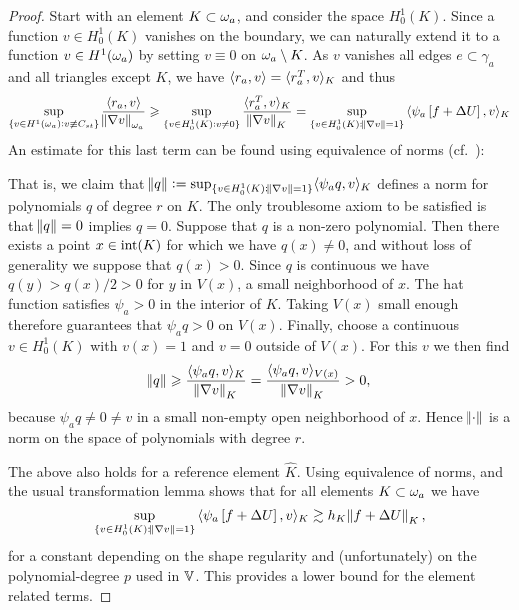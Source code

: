 \documentclass[thesis.tex]{subfiles}
\begin{document}
\begin{proof}
  Start with an element $K \subset \omega_a$, and consider the space $H_0^1(K)$. Since a function $v \in H_0^1(K)$ vanishes on the boundary, 
  we can naturally extend it to a function $v \in H^1(\omega_a)$ by setting $v \equiv 0$ on $\omega_a \setminus K$. As $v$
  vanishes all edges $e \subset \gamma_a$ and all triangles except $K$, we have $\langle r_a, v \rangle = \langle{r_a^T, v}\rangle_K$ and thus
  \[
    \sup_{\{v \in H^1(\omega_a) : v \not \equiv C_{st}\}} { \langle r_a, v \rangle \over \norm{\nabla v}_{\omega_a}} 
    \geqslant \sup_{\{v \in H_0^1(K) : v \ne 0\}} { \langle{r^T_a, v}\rangle_K \over \norm{\nabla v}_{K}}
    = \sup_{\{v \in H_0^1(K) :  \norm{\nabla v}=1\}} { \langle\psi_a\left[ f + \Delta U\right],v\rangle_K }
  \]
  An estimate for this last term can be found using equivalence of norms (cf.~\cite[Ex~9.x.5]{brenner}):
  
  That is, we claim that $\norm{q} := \sup_{\{v \in H_0^1(K) : \norm{\nabla v}=1\}} \langle \psi_a q, v\rangle_K$
  defines a norm for polynomials $q$ of degree $r$ on $K$. The only troublesome axiom to be satisfied
  is that $\norm{q} = 0$  implies $q=0$. Suppose that $q$ is a non-zero polynomial.
  Then there exists a point $x \in \operatorname{int}(K)$ for which we have $q(x) \ne 0$, and without loss of generality we suppose that $q(x) > 0$.
  Since $q$ is continuous we have $q(y) > q(x) / 2 > 0$ for $y$ in $V(x)$, a small neighborhood of $x$.
  The hat function satisfies $\psi_a > 0$ in the interior of $K$. Taking $V(x)$ small enough therefore guarantees that $\psi_a q>0$ on $V(x)$.
  Finally, choose a continuous $v \in H_0^1(K)$  with $v(x) = 1$ and $v = 0$ outside of $V(x)$. For this $v$ we then find
  \[
    \norm{q} \geqslant { \langle  \psi_a q, v\rangle_K \over \norm{\nabla v}_K}  = {\langle \psi_a q, v\rangle_{V(x)} \over \norm{\nabla v}_K} > 0,
  \]
  because $\psi_a q \ne 0 \ne v$ in a small non-empty open neighborhood of $x$. Hence $\norm{\cdot}$ is a norm on the space of polynomials with degree $r$.
  
  The above also holds for a reference element $\hat K$. Using equivalence of norms, and the usual transformation lemma
  shows that for all elements $K \subset \omega_a$ we have
  \[
    \sup_{\{v \in H_0^1(K) :  \norm{\nabla v}=1\}} { \langle\psi_a\left[ f + \Delta U\right],v\rangle_K } \gtrsim h_K \norm{ f + \Delta U }_K,
  \]
  for a constant depending on the shape regularity and (unfortunately) on the polynomial-degree $p$ used in $\mathbb{V}$.  This
  provides a lower bound for the element related terms.
  

\end{proof}
\end{document}
